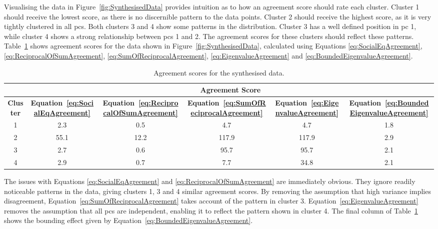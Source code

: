 			Visualising the data in Figure~\ref{fig:SynthesisedData} provides intuition as to how an agreement
			score should rate each cluster. Cluster 1 should receive the lowest score, as there is no
			discernible pattern to the data points. Cluster 2 should receive the highest score, as it is very
			tightly clustered in all \acrshort{pc}s. Both clusters 3 and 4 show some patterns in the
			distribution. Cluster 3 has a well defined position in \acrshort{pc} 1, while cluster 4 shows a
			strong relationship between \acrshort{pc}s 1 and 2. The agreement scores for these clusters should
			reflect these patterns. Table~\ref{tab:SynthesisedDataAgreement} shows agreement scores for the
			data shown in Figure~\ref{fig:SynthesisedData}, calculated using Equations
			\ref{eq:SocialEqAgreement}, \ref{eq:ReciprocalOfSumAgreement}, \ref{eq:SumOfReciprocalAgreement},
			\ref{eq:EigenvalueAgreement} and \ref{eq:BoundedEigenvalueAgreement}.

			\begin{table}[h!]
				\centering
				\begin{tabular}{|c|c|c|c|c|c|}
					\cline{2-6}
					\multicolumn{1}{c|}{} & \multicolumn{5}{c|}{\bf{Agreement Score}} \tabularnewline
					\hline
					\bf{Cluster} & \bf{Equation~\ref{eq:SocialEqAgreement}} & 
					\bf{Equation~\ref{eq:ReciprocalOfSumAgreement}} &
					\bf{Equation~\ref{eq:SumOfReciprocalAgreement}} & 
					\bf{Equation~\ref{eq:EigenvalueAgreement}} &
					\bf{Equation~\ref{eq:BoundedEigenvalueAgreement}} \tabularnewline
					\hline
					\hline
					1 & 2.3 & 0.5 & 4.7 & 4.7 & 1.8 \tabularnewline
					\hline
					2 & 55.1 & 12.2 & 117.9 & 117.9 & 2.9 \tabularnewline
					\hline
					3 & 2.7 & 0.6 & 95.7 & 95.7 & 2.1 \tabularnewline
					\hline
					4 & 2.9 & 0.7 & 7.7 & 34.8 & 2.1 \tabularnewline
					\hline
				\end{tabular}
				\caption{Agreement scores for the synthesised data.}
				\label{tab:SynthesisedDataAgreement}
			\end{table}

			The issues with Equations \ref{eq:SocialEqAgreement} and \ref{eq:ReciprocalOfSumAgreement} are
			immediately obvious. They ignore readily noticeable patterns in the data, giving clusters 1, 3 and
			4 similar agreement scores. By removing the assumption that high variance implies disagreement,
			Equation~\ref{eq:SumOfReciprocalAgreement} takes account of the pattern in cluster 3.
			Equation~\ref{eq:EigenvalueAgreement} removes the assumption that all \acrshort{pc}s are
			independent, enabling it to reflect the pattern shown in cluster 4. The final column of
			Table~\ref{tab:SynthesisedDataAgreement} shows the bounding effect given by
			Equation~\ref{eq:BoundedEigenvalueAgreement}.

